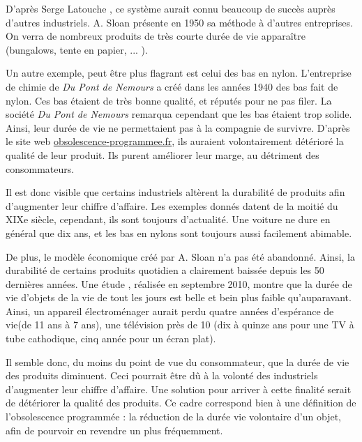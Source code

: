 D'après Serge Latouche \cite{bpc}, ce système aurait connu beaucoup de succès auprès d'autres industriels. A. Sloan présente en 1950 sa méthode à d'autres entreprises. On verra de nombreux produits de très courte durée de vie apparaître (bungalows, tente en papier, ... ).

Un autre exemple, peut être plus flagrant est celui des bas en nylon.  L'entreprise de chimie de \textit{Du Pont de Nemours} a créé dans les années 1940 des bas fait de nylon. Ces bas étaient de très bonne qualité, et réputés pour ne pas filer. La société \textit{Du Pont de Nemours} remarqua cependant que les bas étaient trop solide. Ainsi, leur durée de vie ne permettaient pas à la compagnie de survivre. D'après le site web \url{obsolescence-programmee.fr}, ils auraient volontairement détérioré la qualité de leur produit. Ils purent améliorer leur marge, au détriment des consommateurs. 

\smallbreak

Il est donc visible que certains industriels altèrent la durabilité de produits afin d'augmenter leur chiffre d'affaire. Les exemples donnés datent de la moitié du XIXe siècle, cependant, ils sont toujours d'actualité. Une voiture ne dure en général que dix ans, et les bas en nylons sont toujours aussi facilement abimable. 

De plus, le modèle économique créé par A. Sloan n'a pas été abandonné. Ainsi, la durabilité de certains produits quotidien a clairement baissée depuis les 50 dernières années. 
Une étude \cite{opSsg}, réalisée en septembre 2010, montre que la durée de vie d'objets de la vie de tout les jours est belle et bein plus faible qu'auparavant. Ainsi, un appareil électroménager aurait perdu quatre années d'espérance de vie(de 11 ans à 7 ans), une télévision près de 10 (dix à quinze ans pour une TV à tube cathodique, cinq année pour un écran plat). 

Il semble donc, du moins du point de vue du consommateur, que la durée de vie des produits diminuent. Ceci pourrait être dû à la volonté des industriels d'augmenter leur chiffre d'affaire. Une solution pour arriver à cette finalité serait de détériorer la qualité des produits. Ce cadre correspond  bien à une définition de l'obsolescence programmée : la réduction de la durée vie volontaire d'un objet, afin de pourvoir en revendre un plus fréquemment. 
